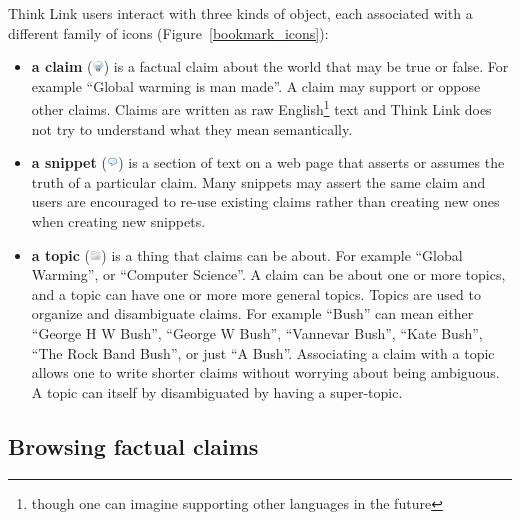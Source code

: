 \documentclass{chi2009}
\begin{document}
Think Link users interact with three kinds of object, each associated with a different family of icons (Figure~\ref{bookmark_icons}): 	

\begin{itemize}
\item {\bf a claim} (\includegraphics[width=0.3cm]{../images/lightbulb_off.png}) is a factual claim about the world that may be true or false. For example ``Global warming is man made''. A claim may support or oppose other claims. Claims are written as raw English\footnote{though one can imagine supporting other languages in the future} text and Think Link does not try to understand what they mean semantically.
\item {\bf a snippet} (\includegraphics[width=0.3cm]{../images/comment.png}) is a section of text on a web page that asserts or assumes the truth of a particular claim. Many snippets may assert the same claim and users are encouraged to re-use existing claims rather than creating new ones when creating new snippets.
\item {\bf a topic} (\includegraphics[width=0.3cm]{../images/folder_grey.png}) is a thing that claims can be about. For example ``Global Warming'', or ``Computer Science''. A claim can be about one or more topics, and a topic can have one or more more general topics. Topics are used to organize and disambiguate claims. For example ``Bush'' can mean either ``George H W Bush'', ``George W Bush'', ``Vannevar Bush'', ``Kate Bush'', ``The Rock Band Bush'', or just ``A Bush''. Associating a claim with a topic allows one to write shorter claims without worrying about being ambiguous. A topic can itself by disambiguated by having a super-topic.
\end{itemize}


\subsection{Browsing factual claims}
\label{browseclaim}\label{claimbrowser}
\end{document}

